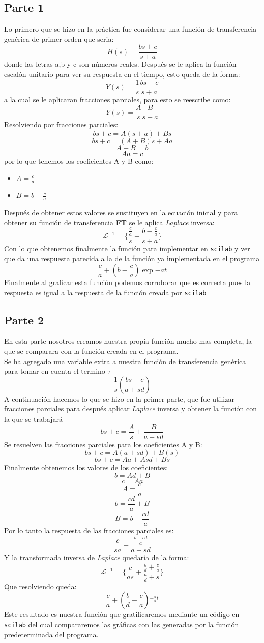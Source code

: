 \documentclass[letterpaper,10pt]{article}
\begin{document}
	\subsection{Parte 1}
	Lo primero que se hizo en la práctica fue considerar una función de transferencia genérica de primer orden que seria:
	\[H(s)=\frac{bs+c}{s+a}\]
	donde las letras a,b y c son números reales. Después se le aplica la función escalón unitario para ver su respuesta en el tiempo, esto queda de la forma:
	\[Y(s)=\frac{1}{s}\frac{bs+c}{s+a}\]
	a la cual se le aplicaran fracciones parciales, para esto se reescribe como:
	\[Y(s)=\frac{A}{s}\frac{B}{s+a}\]
	Resolviendo por fracciones parciales:
	\[bs+c=A(s+a)+Bs\]
	\[bs+c=(A+B)s+Aa\]
	\[A+B=b\]
	\[Aa=c\]
	por lo que tenemos los coeficientes A y B como:
	\begin{itemize}
		\item $A=\frac{c}{a}$
		\item $B=b-\frac{c}{a}$
	\end{itemize}
Después de obtener estos valores se sustituyen en la ecuación inicial y para obtener su función de transferencia \textbf{FT} se le aplica \textit{Laplace} inversa:
\[\mathcal{L}^{-1}=\{\frac{\frac{c}{a}}{s}+\frac{b-\frac{c}{a}}{s+a}\}\]
Con lo que obtenemos finalmente la función para implementar en \texttt{scilab} y ver que da una respuesta parecida a la de la función ya implementada en el programa
\[\frac{c}{a}+(b-\frac{c}{a})\exp{-at} \]
Finalmente al graficar esta función podemos corroborar que es correcta pues la respuesta es igual a la respuesta de la función creada por \texttt{scilab}
\pagebreak 
	\subsection{Parte 2}
	En esta parte nosotros creamos nuestra propia función mucho mas completa, la que se comparara con la función creada en el programa.\\
	Se ha agregado una variable extra a nuestra función de transferencia genérica para tomar en cuenta el termino $\tau$\\
	\[\frac{1}{s}(\frac{bs+c}{a+sd})\]
	A continuación hacemos lo que se hizo en la primer parte, que fue utilizar fracciones parciales para después aplicar \textit{Laplace} inversa y obtener la función con la que se trabajará
	\[bs+c=\frac{A}{s}+\frac{B}{a+sd}\]
	Se resuelven las fracciones parciales para los coeficientes A y B:
	\[bs+c=A(a+sd)+B(s)\]
	\[bs+c=Aa+Asd+Bs\]
	Finalmente obtenemos los valores de los coeficientes:
	\[b=Ad+B\]
	\[c=Aa\]  \[A=\frac{c}{a}\]
	\[b=\frac{cd}{a}+B\]
	\[B=b-\frac{cd}{a}\]
	Por lo tanto la respuesta de las fracciones parciales es:
	\[\frac{c}{sa}+\frac{\frac{b-cd}{a}}{a+sd}\]
	Y la transformada inversa de \textit{Laplace} quedaría de la forma:
	\[\mathcal{L}^{-1}=\{  \frac{c}{as}+\frac{\frac{b}{d}+\frac{c}{a}}{\frac{a}{d}+s}\} \]
	Que resolviendo queda:
	\[\frac{c}{a}+(\frac{b}{d}-\frac{c}{a}) \mathcal{} ^{-\frac{a}{d}t}\]
	Este resultado es nuestra función que gratificaremos mediante un código en \texttt{scilab} del cual compararemos las gráficas con las generadas por la función predeterminada del programa.
	\pagebreak
\end{document}
